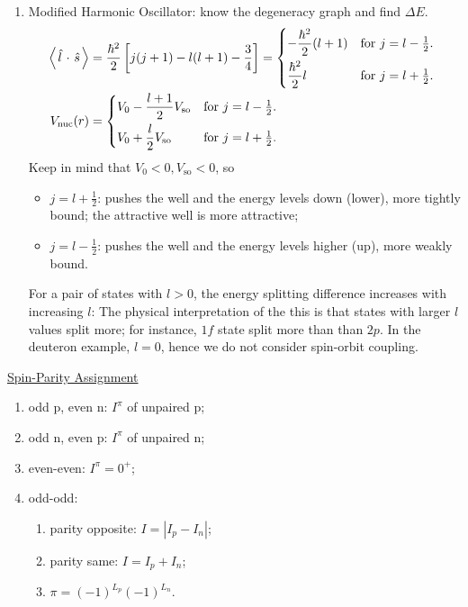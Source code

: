 \documentclass{school-22.101-notes}
\begin{document}
\begin{enumerate}
\begin{enumerate}
    \item Modified Harmonic Oscillator: know the degeneracy graph and find $\Delta E$. 
    \begin{align}
        \expect{\lhat \cdot \shat} &= \frac{\hbar^2}{2} \left[ j(j+1) - l(l+1) - \frac{3}{4} \right] 
        =
        \begin{dcases*}
        - \frac{\hbar^2}{2} (l+1) & for $j = l-\frac{1}{2}$. \\ 
        \frac{\hbar^2}{2} l & for $j = l + \frac{1}{2}$. \\
        \end{dcases*} 
        \\
        V_{\mathrm{nuc}} (r) &= 
        \begin{dcases*}
        V_0 - \frac{l+1}{2} V_{\mathrm{so}} & for $j = l-\frac{1}{2}$. \\ 
        V_0 + \frac{l}{2} V_{\mathrm{so}} & for $j = l + \frac{1}{2}$. \\
        \end{dcases*}
    \end{align}
    Keep in mind that $V_0 < 0, V_{\mathrm{so}} < 0$, so 
    \begin{itemize}
        \item $j = l+\frac{1}{2}$: pushes the well and the energy levels down (lower), more tightly bound; the attractive well is more attractive; 
        \item $j = l - \frac{1}{2}$: pushes the well and the energy levels higher (up), more weakly bound.  
    \end{itemize}    
     For a pair of states with $l>0$, the energy splitting difference increases with increasing $l$:
The physical interpretation of the this is that states with larger $l$ values split more; for instance, $1f$ state split more than than $2p$. In the deuteron example, $l=0$, hence we do not consider spin-orbit coupling.               
    \end{enumerate}
\end{enumerate}


\uline{Spin-Parity Assignment}
\begin{enumerate}
\item odd p, even n: $I^{\pi}$ of unpaired p;
\item odd n, even p: $I^{\pi}$ of unpaired n;
\item even-even: $I^{\pi} = 0^+$;
\item odd-odd: 
    \begin{enumerate}
    \item parity opposite: $I = |I_p - I_n|$;
    \item parity same: $I = I_p + I_n$;
    \item $\pi = (-1)^{L_p} (-1)^{L_n}$. 
    \end{enumerate}
\end{enumerate}
\end{document}
